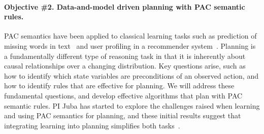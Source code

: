 \documentclass[12pt]{article}
\newcommand{\note}[1]{\textbf{\textit{#1}}}
\begin{document}
\paragraph{Objective \#2. Data-and-model driven planning with PAC semantic rules.}
PAC semantics have been applied to classical learning tasks such as prediction of missing words in text~\cite{michael2008first} and user profiling in a recommender system~\cite{semeraro2009knowledge}. Planning is a fundamentally different type of reasoning task in that it is inherently about causal relationships over a changing distribution. Key questions arise, such as how to identify which state variables are preconditions of an observed action, and how to identify rules that are effective for planning. We will address these fundamental questions, and 
develop effective algorithms that plan with PAC semantic rules. PI Juba has started to explore the challenges raised when learning and using PAC semantics for planning, and these initial results suggest that integrating learning into planning simplifies both tasks~\cite{juba2016jmlr}. 



\end{document}
